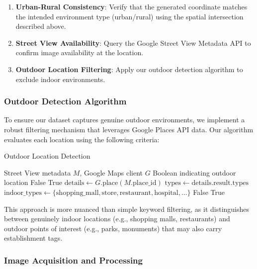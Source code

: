 \begin{enumerate}
    \item \textbf{Urban-Rural Consistency}: Verify that the generated coordinate matches the intended environment type (urban/rural) using the spatial intersection described above.
    \item \textbf{Street View Availability}: Query the Google Street View Metadata API to confirm image availability at the location.
    \item \textbf{Outdoor Location Filtering}: Apply our outdoor detection algorithm to exclude indoor environments.
\end{enumerate}

\subsubsection{Outdoor Detection Algorithm}

To ensure our dataset captures genuine outdoor environments, we implement a robust filtering mechanism that leverages Google Places API data. Our algorithm evaluates each location using the following criteria:

\begin{algorithm}[t]
\caption{Outdoor Location Detection}
\label{alg:outdoor_detection}
\begin{algorithmic}[1]
\Require Street View metadata $M$, Google Maps client $G$
\Ensure Boolean indicating outdoor location
    \State \Return False
\EndIf
{}
    \State \Return True 
\EndIf
\State $\mathrm{details} \gets G.\mathrm{place}(M.\mathrm{place\_id})$
\State $\mathrm{types} \gets \mathrm{details.result.types}$
\State $\mathrm{indoor\_types} \gets \{\mathrm{shopping\_mall}, \mathrm{store}, \mathrm{restaurant}, \mathrm{hospital}, \ldots\}$
    \State \Return False
\Else
    \State \Return True
\EndIf
\end{algorithmic}
\end{algorithm}

This approach is more nuanced than simple keyword filtering, as it distinguishes between genuinely indoor locations (e.g., shopping malls, restaurants) and outdoor points of interest (e.g., parks, monuments) that may also carry establishment tags.

\subsubsection{Image Acquisition and Processing}


